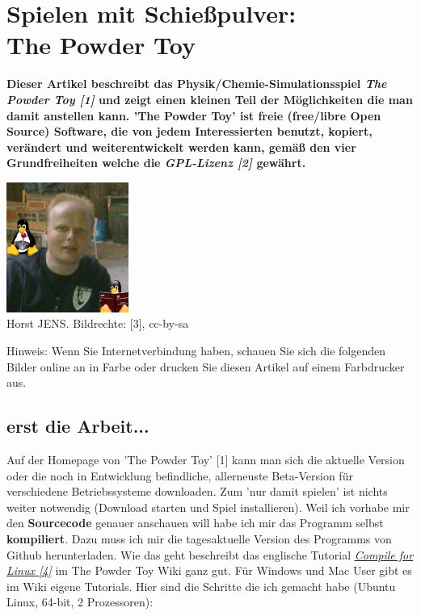 \section*{Spielen mit Schießpulver: \\
The Powder Toy}
\hypertarget{powdertoy}{}
\label{powdertoy}

\textbf{Dieser Artikel beschreibt das Physik/Chemie-Simulationsspiel \textit{The Powder Toy [1]} und zeigt einen kleinen Teil der Möglichkeiten die man damit anstellen kann. 'The Powder Toy' ist freie (free/libre Open Source) Software, die von jedem Interessierten benutzt, kopiert, verändert und weiterentwickelt werden kann, gemäß den vier Grundfreiheiten welche die \textit{GPL-Lizenz [2]} gewährt.}

\begin{center}
\includegraphics[width=4cm]{horst2011mitdoppeltux.jpg} \\
\footnotesize{Horst JENS. Bildrechte: [3], cc-by-sa}
\end{center}


{Hinweis:} Wenn Sie Internetverbindung haben, schauen Sie sich die folgenden Bilder online an in Farbe oder drucken Sie diesen Artikel auf einem Farbdrucker aus.

\subsection*{erst die Arbeit...}

Auf der Homepage von 'The Powder Toy' [1] kann man sich die aktuelle Version oder die noch in Entwicklung befindliche, allerneuste Beta-Version für verschiedene Betriebssysteme downloaden. Zum 'nur damit spielen' ist nichts weiter notwendig (Download starten und Spiel installieren). Weil ich vorhabe mir den \textbf{Sourcecode} genauer anschauen will habe ich mir das Programm selbst \textbf{kompiliert}. Dazu muss ich mir die tagesaktuelle Version des Programms von Github herunterladen. Wie das geht beschreibt das englische Tutorial \href{http://goo.gl/LK4z01}{\textit{Compile for Linux [4]}} im The Powder Toy Wiki ganz gut. Für Windows und Mac User gibt es im Wiki eigene Tutorials. Hier sind die Schritte die ich gemacht habe (Ubuntu Linux, 64-bit, 2 Prozessoren):


